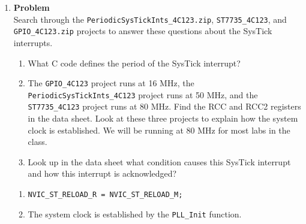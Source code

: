 \documentclass[12pt]{article}
\newenvironment{Ex}{\textbf{Problem}\vspace{.75em}\\}{}
\begin{document}
\begin{enumerate}
\begin{Ex}
\begin{solution}
\begin{enumerate}
\begin{itemize}
        \item pin 6 (\verb|TFT_CS|) connected to PA3 (\verb|SSI0Fss|)
        \item pin 5 (\verb|CARD_CS|) unconnected
        \item pin 4 (Data/Command) connected to PA6 (\verb|GPIO|)
        \item pin 3 (\verb|RESET|) connected to PA7 (\verb|GPIO|)
        \item pin 2 (\verb|VCC|) connected to +3.3 V
        \item pin 1 (\verb|GND|) connected to ground
        \end{itemize}
      \item The I$^2$C shares PA6 and PA7. SSI pins also shared.
      \end{enumerate}
    \end{solution}
  \end{Ex}
\item
  \begin{Ex}
    Search through the \verb|PeriodicSysTickInts_4C123.zip|,
    \verb|ST7735_4C123|, and \verb|GPIO_4C123.zip| projects to answer
    these questions about the SysTick interrupts.
    \begin{enumerate}
    \item What C code defines the period of the SysTick
      interrupt?
    \item The \verb|GPIO_4C123| project runs at 16 MHz, the
      \verb|PeriodicSysTickInts_4C123| project runs at 50 MHz, and the
      \verb|ST7735_4C123| project runs at 80 MHz. Find the RCC and RCC2
      registers in the data sheet. Look at these three projects to
      explain how the system clock is established. We will be running
      at 80 MHz for most labs in the class.
    \item Look up in the data sheet what condition causes this SysTick
      interrupt and how this interrupt is acknowledged?
    \end{enumerate}
    \begin{solution}
      \begin{enumerate} \hfill \vspace{.75em} \\
      \item \verb|NVIC_ST_RELOAD_R = NVIC_ST_RELOAD_M;|
      \item The system clock is established by the \verb|PLL_Init|
        function.


\end{enumerate}
\end{solution}
\end{Ex}
\end{enumerate}
\end{document}
